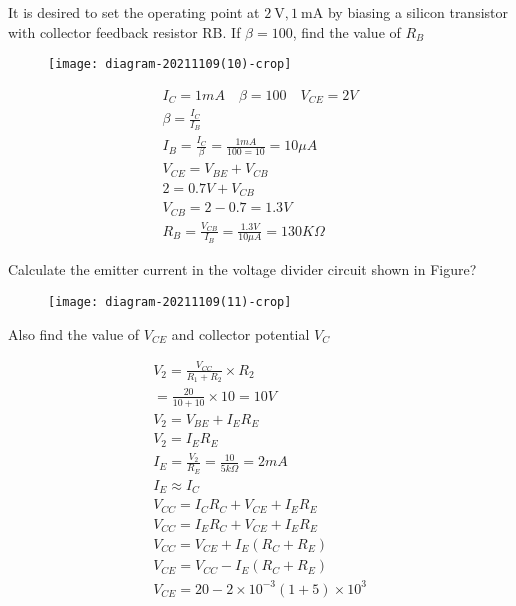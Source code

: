 \begin{enumerate}
	\begin{minipage}{\textwidth}
	\item  It is desired to set the operating point at $2 \mathrm{~V}, 1 \mathrm{~mA}$ by biasing a silicon transistor with collector feedback resistor RB. If $\beta=100$, find the value of $R_B$
	\begin{figure}[H]
		\centering
		\texttt{[image: diagram-20211109(10)-crop]}
	\end{figure}
\end{minipage}
\begin{answer}
\begin{align*}
I_C=1mA \quad \beta=100 \quad V_{CE}=2V\\
\beta=\frac{I_C}{I_B}\\
I_B=\frac{I_C}{\beta}=\frac{1mA}{100=10}=10\mu A\\
V_{CE}=V_{BE}+V_{CB}\\
2=0.7V+V_{CB}\\
V_{CB}=2-0.7=1.3V\\
R_B=\frac{V_{CB}}{I_B}=\frac{1.3V}{10 \mu A}=130K\Omega
\end{align*}	
\end{answer}
	\begin{minipage}{\textwidth}
	\item Calculate the emitter current in the voltage divider circuit shown in Figure?
	\begin{figure}[H]
		\centering
		\texttt{[image: diagram-20211109(11)-crop]}
	\end{figure}
	Also find the value of $V_{CE} $ and collector potential $V_C$
\end{minipage}
\begin{answer}
\begin{align*}
V_2=\frac{V_{CC}}{R_1+R_2}\times R_2\\
=\frac{20}{10+10}\times 10=10V\\
V_2=V_{BE}+I_ER_E\\
V_2=I_ER_E\\
I_E=\frac{V_2}{R_E}=\frac{10}{5k\Omega}=2mA\\
I_E\approx I_C\\
V_{CC}=I_CR_C+V_{CE}+I_ER_E\\
V_{CC}=I_ER_C+V_{CE}+I_ER_E\\
V_{CC}=V_{CE}+I_E(R_C+R_E)\\
V_{CE}=V_{CC}-I_E(R_C+R_E)\\
V_{CE}=20-2\times 10^{-3}(1+5)\times 10^3\\

\end{align*}
\end{answer}
\end{enumerate}
